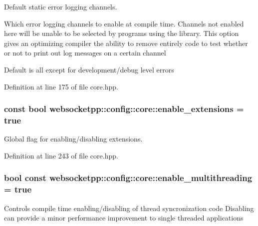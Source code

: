 Default static error logging channels. 

Which error logging channels to enable at compile time. Channels not enabled here will be unable to be selected by programs using the library. This option gives an optimizing compiler the ability to remove entirely code to test whether or not to print out log messages on a certain channel

Default is all except for development/debug level errors 

Definition at line 175 of file core.\+hpp.

\hypertarget{structwebsocketpp_1_1config_1_1core_af2944a777c23010137c55fdfcfb8c352}{}
\subsubsection[{enable\+\_\+extensions}]{\setlength{\rightskip}{0pt plus 5cm}const bool websocketpp\+::config\+::core\+::enable\+\_\+extensions = true\hspace{0.3cm}{\ttfamily [static]}}\label{structwebsocketpp_1_1config_1_1core_af2944a777c23010137c55fdfcfb8c352}


Global flag for enabling/disabling extensions. 



Definition at line 243 of file core.\+hpp.

\hypertarget{structwebsocketpp_1_1config_1_1core_ad3ed5fc89c7a79e7c2c5193f640d87ba}{}
\subsubsection[{enable\+\_\+multithreading}]{\setlength{\rightskip}{0pt plus 5cm}bool const websocketpp\+::config\+::core\+::enable\+\_\+multithreading = true\hspace{0.3cm}{\ttfamily [static]}}\label{structwebsocketpp_1_1config_1_1core_ad3ed5fc89c7a79e7c2c5193f640d87ba}
Controls compile time enabling/disabling of thread syncronization code Disabling can provide a minor performance improvement to single threaded applications 

